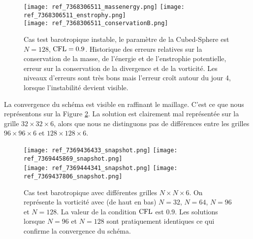 \begin{figure}[htbp]
\begin{center}
\texttt{[image: ref\_7368306511\_massenergy.png]}
\texttt{[image: ref\_7368306511\_enstrophy.png]}\\
\texttt{[image: ref\_7368306511\_conservationB.png]}
\end{center}
\caption{Cas test barotropique instable, le paramètre de la Cubed-Sphere est $N=128$, $\text{CFL}=0.9$. Historique des erreurs relatives sur la conservation de la masse, de l'énergie et de l'enstrophie potentielle, erreur sur la conservation de la divergence et de la vorticité. Les niveaux d'erreurs sont très bons mais l'erreur croît autour du jour 4, lorsque l'instabilité devient visible.}
\label{fig: galewsky conservation}
\end{figure}

La convergence du schéma est visible en raffinant le maillage. C'est ce que nous représentons sur la Figure \ref{fig: galewsky convergence}. La solution est clairement mal représentée sur la grille $32 \times 32 \times 6$, alors que nous ne distinguons pas de différences entre les grilles $96 \times 96\times 6$ et $128 \times 128\times 6$.

\begin{figure}[htbp]
\begin{center}
\texttt{[image: ref\_7369436433\_snapshot.png]}
\texttt{[image: ref\_7369445869\_snapshot.png]}\\
\texttt{[image: ref\_7369444341\_snapshot.png]}
\texttt{[image: ref\_7369437806\_snapshot.png]}
\end{center}
\caption{Cas test barotropique avec différentes grilles $N \times N \times 6$. On représente la vorticité avec (de haut en bas) $N=32$, $N=64$, $N=96$ et $N=128$. La valeur de la condition $\text{CFL}$ est $0.9$. Les solutions lorsque $N=96$ et $N=128$ sont pratiquement identiques ce qui confirme la convergence du schéma.}
\label{fig: galewsky convergence}
\end{figure}



























